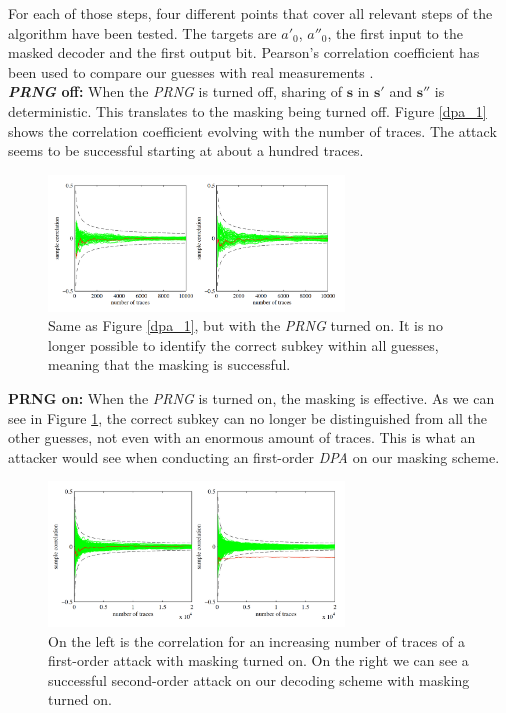 For each of those steps, four different points that cover all relevant steps of the algorithm have been tested. The targets are \(a'_0\), \(a''_0\), the first input to the masked decoder and the first output bit. Pearson's correlation coefficient has been used to compare our guesses with real measurements \cite{Brier2004}.
\\\textbf{\textit{\acs{PRNG}} off:} When the \textit{\ac{PRNG}} is turned off, sharing of \(\textbf{s}\) in \(\textbf{s}'\) and \(\textbf{s}''\) is deterministic. This translates to the masking being turned off. Figure \ref{dpa_1} shows the correlation coefficient evolving with the number of traces. The attack seems to be successful starting at about a hundred traces.
\begin{figure}[H]
	\centering
	\includegraphics[width=0.7\textwidth]{dpa_2.png}
	\caption{Same as Figure \ref{dpa_1}, but with the \textit{\acs{PRNG}} turned on. It is no longer possible to identify the correct subkey within all guesses, meaning that the masking is successful. \cite{maskedRing}}
	\label{dpa_2}
\end{figure}
\textbf{\acs{PRNG} on:} When the \textit{\acs{PRNG}} is turned on, the masking is effective. As we can see in Figure \ref{dpa_2}, the correct subkey can no longer be distinguished from all the other guesses, not even with an enormous amount of traces. This is what an attacker would see when conducting an first-order \textit{\ac{DPA}} on our masking scheme.
\begin{figure}[H]
	\centering
	\includegraphics[width=0.7\textwidth]{dpa_3.png}
	\caption{On the left is the correlation for an increasing number of traces of a first-order attack with masking turned on. On the right we can see a successful second-order attack on our decoding scheme with masking turned on. \cite{maskedRing}}
	\label{dpa_3}
\end{figure}
